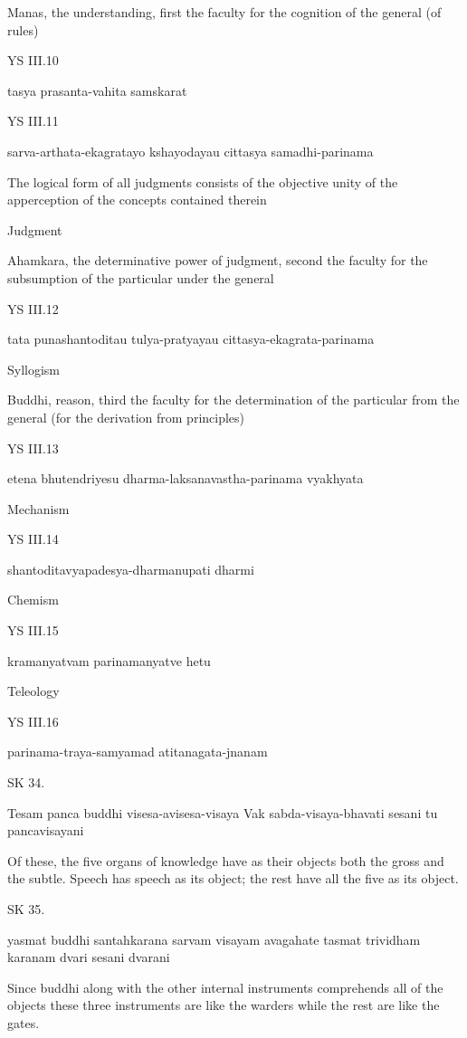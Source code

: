     Manas, the understanding, first the faculty for the cognition of the general (of rules)

YS III.10

    tasya prasanta-vahita samskarat

YS III.11

    sarva-arthata-ekagratayo kshayodayau cittasya samadhi-parinama

    The logical form of all judgments consists of the objective unity of the apperception of the concepts contained therein

    Judgment

    Ahamkara, the determinative power of judgment, second the faculty for the subsumption of the particular under the general

YS III.12

    tata punashantoditau tulya-pratyayau cittasya-ekagrata-parinama

    Syllogism

    Buddhi, reason, third the faculty for the determination of the particular from the general (for the derivation from principles)

YS III.13

    etena bhutendriyesu dharma-laksanavastha-parinama vyakhyata

    Mechanism

YS III.14

    shantoditavyapadesya-dharmanupati dharmi

    Chemism

YS III.15

    kramanyatvam parinamanyatve hetu

    Teleology

YS III.16

    parinama-traya-samyamad atitanagata-jnanam


SK 34.

Tesam panca buddhi visesa-avisesa-visaya
Vak sabda-visaya-bhavati sesani tu pancavisayani

Of these, the five organs of knowledge have as their objects
both the gross and the subtle.
Speech has speech as its object;
the rest have all the five as its object.

SK 35.

yasmat buddhi santahkarana sarvam visayam avagahate
tasmat trividham karanam dvari sesani dvarani

Since buddhi along with the other internal instruments
comprehends all of the objects these three instruments are
like the warders while the rest are like the gates.

